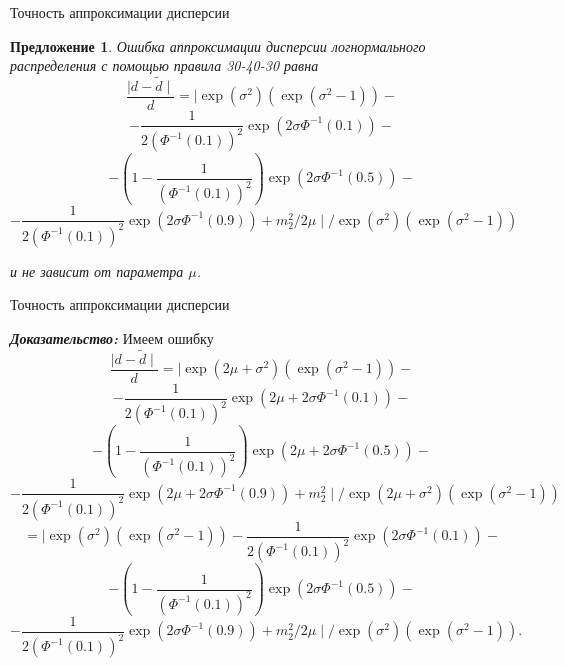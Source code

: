 \documentclass[ucs, notheorems, handout]{beamer}
\newtheorem{proposition}[theorem]{Предложение}
\begin{document}
\begin{frame}{Точность аппроксимации дисперсии}
	\begin{proposition}\label{pr6}
		Ошибка аппроксимации дисперсии логнормального распределения с помощью правила 30-40-30 равна
		\[\dfrac{\mid d - \widetilde{d} \mid}{d} = \mid \exp(\sigma^{2})(\exp(\sigma^{2}-1)) -\]\[- \dfrac{1}{2(\Phi^{-1}(0.1))^{2}}\exp(2\sigma\Phi^{-1}(0.1))-\]
		\[- \left(1 - \dfrac{1}{(\Phi^{-1}(0.1))^{2}}\right)\exp(2\sigma\Phi^{-1}(0.5))-\]
		\[-\dfrac{1}{2(\Phi^{-1}(0.1))^{2}}\exp(2\sigma\Phi^{-1}(0.9)) + m_{2}^{2}/2\mu\mid/\exp(\sigma^{2})(\exp(\sigma^{2}-1))\]
		
		и не зависит от параметра $\mu$.
	\end{proposition}
\end{frame}
\begin{frame}{Точность аппроксимации дисперсии}
	
	\textit{\textbf{Доказательство:}}
	Имеем ошибку
	\[\dfrac{\mid d - \widetilde{d} \mid}{d} = \mid \exp(2\mu+\sigma^{2})(\exp(\sigma^{2}-1)) -\]\[- \dfrac{1}{2(\Phi^{-1}(0.1))^{2}}\exp(2\mu+2\sigma\Phi^{-1}(0.1))-\]\[-
	 \left(1 - \dfrac{1}{(\Phi^{-1}(0.1))^{2}}\right)\exp(2\mu+2\sigma\Phi^{-1}(0.5))-\]
	\[-\dfrac{1}{2(\Phi^{-1}(0.1))^{2}}\exp(2\mu+2\sigma\Phi^{-1}(0.9)) + m_{2}^{2}\mid/\exp(2\mu+\sigma^{2})(\exp(\sigma^{2}-1))\]
	\[=\mid \exp(\sigma^{2})(\exp(\sigma^{2}-1)) - \dfrac{1}{2(\Phi^{-1}(0.1))^{2}}\exp(2\sigma\Phi^{-1}(0.1))-\]
	\[- \left(1 - \dfrac{1}{(\Phi^{-1}(0.1))^{2}}\right)\exp(2\sigma\Phi^{-1}(0.5))-\]
	\[-\dfrac{1}{2(\Phi^{-1}(0.1))^{2}}\exp(2\sigma\Phi^{-1}(0.9)) + m_{2}^{2}/2\mu\mid/\exp(\sigma^{2})(\exp(\sigma^{2}-1)).\]
	
\end{frame}
\end{document}
